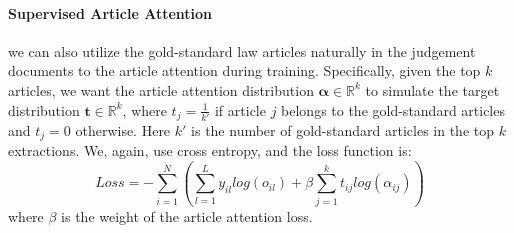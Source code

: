 \paragraph{Supervised Article Attention}
we can also utilize the gold-standard law articles naturally in the judgement documents
to  the article attention during training. Specifically, given the top $k$ articles, we want the article attention distribution $\bm{\alpha}\in\mathbb{R}^k$ to simulate the target distribution $\mathbf{t}\in\mathbb{R}^k$, where $t_j=\frac{1}{k'}$ if article $j$ belongs to the gold-standard articles and $t_j=0$ otherwise. Here $k'$ is the number of gold-standard articles in the top $k$ extractions.
%
%
We, again, use cross entropy, and the loss function is:
\begin{equation}
\label{final_loss}
Loss = -\sum_{i=1}^N(\sum_{l=1}^L{y_{il} log(o_{il})} + \beta \sum_{j=1}^k{t_{ij} log(\alpha_{ij})})
\end{equation}
where $\beta$ is the weight of the article attention loss.




